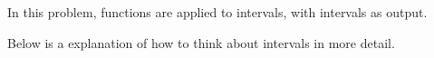 \documentclass[twocolumn,a4paper]{article}
\begin{document}
In this problem, functions are applied to intervals, with intervals as output.

\begin{figure}[ht]
	\centering
	\vspace{-10pt}
	\vspace{-10pt}
\end{figure}

Below is a explanation of how to think about intervals in more detail.
\begin{figure}[ht]
	\centering
	\vspace{-10pt}
	\vspace{-30pt}
\end{figure}
\end{document}

